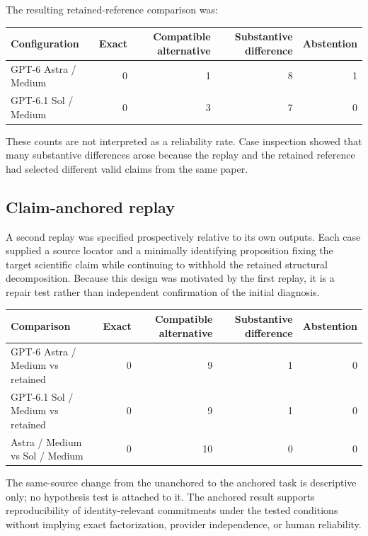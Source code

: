\documentclass[11pt]{article}
\begin{document}
The resulting retained-reference comparison was:

\begin{center}
\small
\begin{tabular}{lrrrr}
\toprule
Configuration & Exact & Compatible alternative & Substantive difference & Abstention \\
\midrule
GPT-6 Astra / Medium & 0 & 1 & 8 & 1 \\
GPT-6.1 Sol / Medium & 0 & 3 & 7 & 0 \\
\bottomrule
\end{tabular}
\end{center}

These counts are not interpreted as a reliability rate. Case inspection showed that many substantive differences arose because the replay and the retained reference had selected different valid claims from the same paper.

\subsection{Claim-anchored replay}

A second replay was specified prospectively relative to its own outputs. Each case supplied a source locator and a minimally identifying proposition fixing the target scientific claim while continuing to withhold the retained structural decomposition. Because this design was motivated by the first replay, it is a repair test rather than independent confirmation of the initial diagnosis.

\begin{center}
\small
\begin{tabular}{lrrrr}
\toprule
Comparison & Exact & Compatible alternative & Substantive difference & Abstention \\
\midrule
GPT-6 Astra / Medium vs retained & 0 & 9 & 1 & 0 \\
GPT-6.1 Sol / Medium vs retained & 0 & 9 & 1 & 0 \\
Astra / Medium vs Sol / Medium & 0 & 10 & 0 & 0 \\
\bottomrule
\end{tabular}
\end{center}

The same-source change from the unanchored to the anchored task is descriptive only; no hypothesis test is attached to it. The anchored result supports reproducibility of identity-relevant commitments under the tested conditions without implying exact factorization, provider independence, or human reliability.
\end{document}
